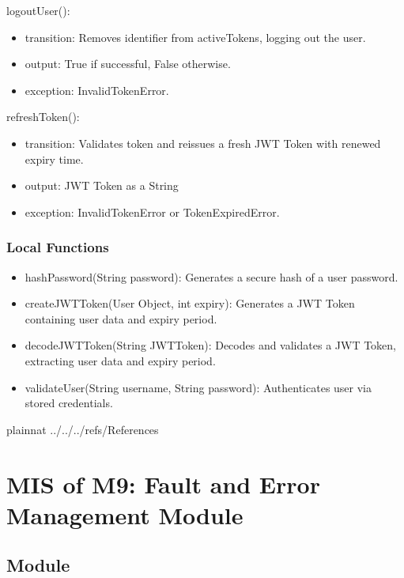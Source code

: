 \documentclass[12pt, titlepage]{article}
\begin{document}
\noindent logoutUser():
\begin{itemize}
\item transition: Removes identifier from activeTokens, logging out the user.
\item output: True if successful, False otherwise.
\item exception: InvalidTokenError.
\end{itemize}

\noindent refreshToken():
\begin{itemize}
\item transition: Validates token and reissues a fresh JWT Token with renewed expiry time.
\item output: JWT Token as a String
\item exception: InvalidTokenError or TokenExpiredError.
\end{itemize}

\subsubsection{Local Functions}

\begin{itemize}
  \item{hashPassword(String password): Generates a secure hash of a user password.}
  \item{createJWTToken(User Object, int expiry): Generates a JWT Token containing user data and expiry period.}
  \item{decodeJWTToken(String JWTToken): Decodes and validates a JWT Token, extracting user data and expiry period.}
  \item{validateUser(String username, String password): Authenticates user via stored credentials.}
\end{itemize}

\newpage

 {plainnat}
 {../../../refs/References}

\newpage

\section{MIS of M9: Fault and Error Management Module} \label{m:M9}

\subsection{Module}
\end{document}
